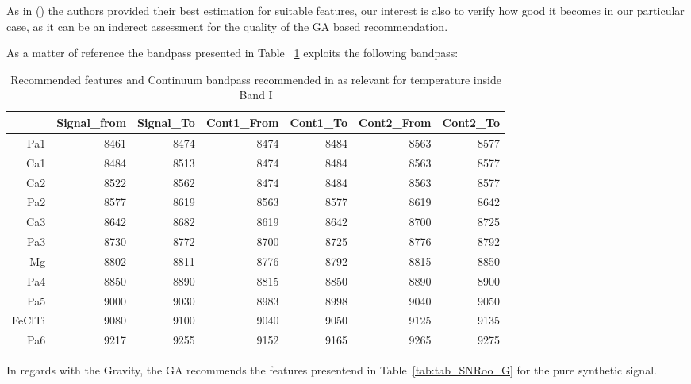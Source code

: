 {{As in (\cite{2013A&A...549A.129C}) the authors provided their 
best estimation for suitable features, our interest is also to verify how
good it becomes in our particular case, as 
it can be an inderect assessment for the quality of the GA based recommendation. 

As a matter of reference the 
bandpass presented in Table ~\ref{tab:tab_cesetti} exploits the following bandpass:

\begin{table}
\begin{center}
\begin{tabular}{rrrrrrr}
  \hline
 & Signal\_from & Signal\_To & Cont1\_From & Cont1\_To & Cont2\_From & Cont2\_To \\ 
  \hline
Pa1 & 8461 & 8474 & 8474 & 8484 & 8563 & 8577 \\ 
  Ca1 & 8484 & 8513 & 8474 & 8484 & 8563 & 8577 \\ 
  Ca2 & 8522 & 8562  & 8474 & 8484 & 8563 & 8577 \\ 
  Pa2 & 8577 & 8619 & 8563 & 8577 & 8619 & 8642 \\ 
  Ca3 & 8642 & 8682 & 8619 & 8642 & 8700 & 8725 \\ 
  Pa3 & 8730 & 8772 & 8700 & 8725 & 8776 & 8792 \\ 
  Mg & 8802 & 8811 & 8776 & 8792 & 8815 & 8850 \\ 
  Pa4 & 8850 & 8890 & 8815 & 8850 & 8890 & 8900 \\ 
  Pa5 & 9000 & 9030 & 8983 & 8998 & 9040 & 9050 \\
  FeClTi & 9080 & 9100 & 9040 & 9050 & 9125 & 9135 \\
  Pa6 & 9217 & 9255 & 9152 & 9165 & 9265 & 9275 \\
   \hline
\end{tabular}
\caption {Recommended features and Continuum bandpass recommended in 
   \cite{2013A&A...549A.129C} as relevant for temperature inside Band I}
   \label{tab:tab_cesetti} 
\end{center}
\end{table}


In regards with the Gravity, the GA recommends the features 
presentend in Table~\ref{tab:tab_SNRoo_G} for the pure synthetic signal.

}}
